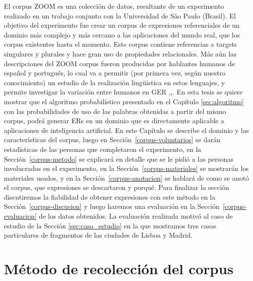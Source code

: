 El corpus ZOOM es una colecci\'on de datos, resultante de un experimento realizado en un trabajo conjunto con la Universidad de S\~ao Paulo (Brasil). El objetivo del experimento fue crear un corpus de expresiones referenciales de un dominio m\'as complejo y m\'as cercano a las aplicaciones del mundo real, que los corpus existentes hasta el momento. Este corpus contiene referencias a targets singulares y plurales y hace gran uso de propiedades relacionales. M\'as a\'un las descripciones del ZOOM corpus fueron producidas por hablantes humanos de espa\~nol y portugu\'es, lo cual va a permitir (por primera vez, seg\'un nuestro conocimiento) un estudio de la realizaci\'on ling\"u\'istica en estos lenguajes, y permite investigar la variaci\'on entre humanos en GER \cite{trainable-speaker},\cite{romina-coling},\cite{non-det}. 
En esta tesis se quiere mostrar que el algoritmo probabil\'istico presentado en el Cap\'itulo \ref{sec:algoritmo} con las probabilidades de uso de las palabras obtenidas a partir del mismo corpus, podr\'a generar ERs en un dominio que es directamente aplicable a aplicaciones de inteligencia artificial.
En este Cap\'itulo se describe el dominio y las caracter\'isticas del corpus, luego en Secci\'on~\ref{corpus-voluntarios} se dar\'an estad\'isticas de las personas que completaron el experimento, en la Secci\'on~\ref{corpus-metodo} se explicar\'a en detalle que se le pidi\'o a las personas involucradas en el experimento, en la Secci\'on~\ref{corpus-materiales} se mostrar\'an los materiales usados, y en la Secci\'on~\ref{corpus-anotacion} se hablar\'a de como se anot\'o el corpus, que expresiones se descartaron y porqu\'e. Para finalizar la secci\'on discutiremos la fiabilidad de obtener expresiones con este m\'etodo en la Secci\'on~\ref{corpus-discusion} y luego haremos una evaluaci\'on en la Secci\'on~\ref{corpus-evaluacion} de los datos obtenidos. La evaluaci\'on realizada motiv\'o al caso de estudio de la Secci\'on \ref{sec:caso_estudio} en la que mostramos tres casos particulares de fragmentos de las ciudades de Lisboa y Madrid.

\section{M\'etodo de recolecci\'on del corpus}


